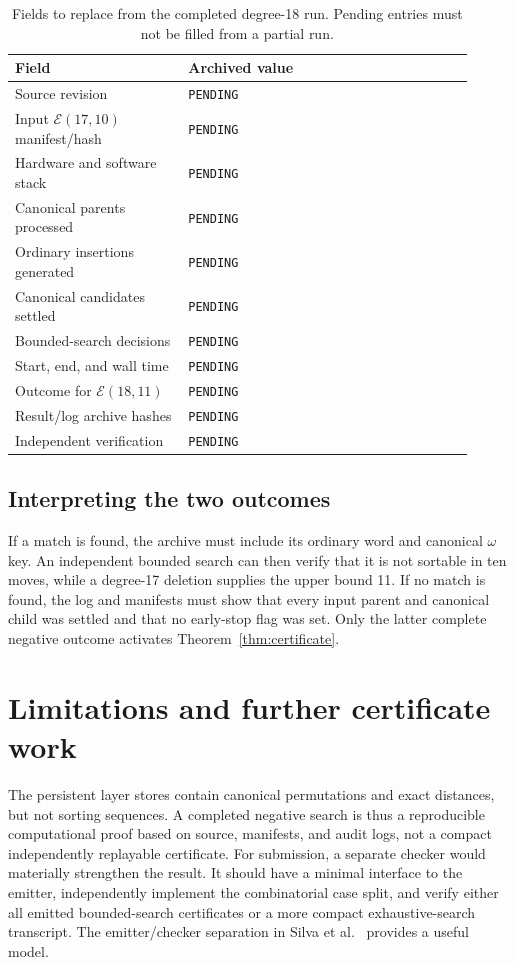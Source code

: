 \documentclass[11pt]{article}
\theoremstyle{definition}
\theoremstyle{remark}
\newcommand{\E}{\mathcal E}
\newcommand{\code}[1]{\texttt{#1}}
\begin{document}
\begin{table}[ht]
\centering
\caption{Fields to replace from the completed degree-18 run.  Pending entries
must not be filled from a partial run.}
\label{tab:final-run}
\begin{tabular}{@{}p{0.34\linewidth}p{0.57\linewidth}@{}}
\toprule
Field & Archived value\\
\midrule
Source revision & \code{PENDING}\\
Input $\E(17,10)$ manifest/hash & \code{PENDING}\\
Hardware and software stack & \code{PENDING}\\
Canonical parents processed & \code{PENDING}\\
Ordinary insertions generated & \code{PENDING}\\
Canonical candidates settled & \code{PENDING}\\
Bounded-search decisions & \code{PENDING}\\
Start, end, and wall time & \code{PENDING}\\
Outcome for $\E(18,11)$ & \code{PENDING}\\
Result/log archive hashes & \code{PENDING}\\
Independent verification & \code{PENDING}\\
\bottomrule
\end{tabular}
\end{table}

\subsection{Interpreting the two outcomes}

If a match is found, the archive must include its ordinary word and canonical
$\omega$ key.  An independent bounded search can then verify that it is not
sortable in ten moves, while a degree-17 deletion supplies the upper bound
11.  If no match is found, the log and manifests must show that every input
parent and canonical child was settled and that no early-stop flag was set.
Only the latter complete negative outcome activates
Theorem~\ref{thm:certificate}.

\section{Limitations and further certificate work}

The persistent layer stores contain canonical permutations and exact
distances, but not sorting sequences.  A completed negative search is thus a
reproducible computational proof based on source, manifests, and audit logs,
not a compact independently replayable certificate.  For submission, a
separate checker would materially strengthen the result.  It should have a
minimal interface to the emitter, independently implement the combinatorial
case split, and verify either all emitted bounded-search certificates or a
more compact exhaustive-search transcript.  The emitter/checker separation in
Silva et al.~\cite{SilvaEtAl2026} provides a useful model.
\end{document}
